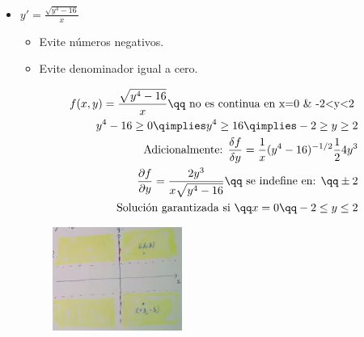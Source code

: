 \begin{itemize}
    \item $\displaystyle y'=\frac{\sqrt{y^4-16}}{x}$ 
        \begin{itemize}
            \item Evite números negativos.
            \item Evite denominador igual a cero.
        \end{itemize}
        \begin{center}
           \begin{align*}
               f(x,y) = \frac{\sqrt{y^4-16}}{x} \qq \text{ no es continua en x=0 \& -2<y<2 } \\ 
               y^4-16 \geq 0 \qimplies y^4 \geq 16 \qimplies -2\geq y \geq 2 \\ 
               \text{ Adicionalmente: } \frac{\delta f}{\delta y} = \frac{1}{x}(y^4-16)^{-1/2} \frac{1}{2}4y^3 \\ 
               \frac{\partial f}{\partial y} = \frac{2y^3}{x\sqrt{y^4-16}} \qq \text{ se indefine en: }\qq \pm 2 \\ 
               \text{ Solución garantizada si } \qq x=0 \qq -2\leq y \leq2 \\ 
           \end{align*}
           \begin{figure}[H]
               \centering
               \includegraphics[width=0.4\textwidth]{./Figs/2021-01-13-10-47-35.png}
           \end{figure}
        \end{center}
\end{itemize}

